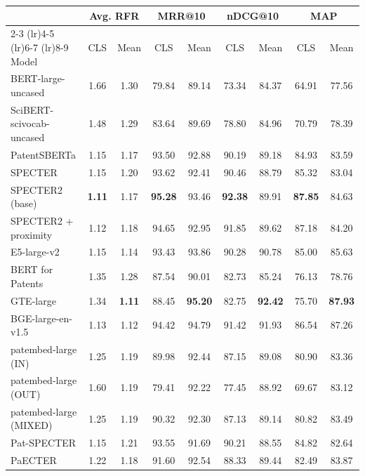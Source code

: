 \begin{tabular}{l cc cc cc cc}
    \toprule
    & \multicolumn{2}{c}{Avg. RFR} & \multicolumn{2}{c}{MRR@10} & \multicolumn{2}{c}{nDCG@10} & \multicolumn{2}{c}{MAP} \\
    \cmidrule(lr){2-3} \cmidrule(lr){4-5} \cmidrule(lr){6-7} \cmidrule(lr){8-9}
Model & CLS & Mean & CLS & Mean & CLS & Mean & CLS & Mean \\
    \midrule
    BERT-large-uncased & 1.66 & 1.30 & 79.84 & 89.14 & 73.34 & 84.37 & 64.91 & 77.56 \\
    SciBERT-scivocab-uncased & 1.48 & 1.29 & 83.64 & 89.69 & 78.80 & 84.96 & 70.79 & 78.39 \\
    PatentSBERTa & 1.15 & 1.17 & 93.50 & 92.88 & 90.19 & 89.18 & 84.93 & 83.59 \\
    SPECTER & 1.15 & 1.20 & 93.62 & 92.41 & 90.46 & 88.79 & 85.32 & 83.04 \\
    SPECTER2 (base) & \textbf{1.11} & 1.17 & \textbf{95.28} & 93.46 & \textbf{92.38} & 89.91 & \textbf{87.85} & 84.63 \\
    SPECTER2 + proximity & 1.12 & 1.18 & 94.65 & 92.95 & 91.85 & 89.62 & 87.18 & 84.20 \\
    E5-large-v2 & 1.15 & 1.14 & 93.43 & 93.86 & 90.28 & 90.78 & 85.00 & 85.63 \\
    BERT for Patents & 1.35 & 1.28 & 87.54 & 90.01 & 82.73 & 85.24 & 76.13 & 78.76 \\
    GTE-large & 1.34 & \textbf{1.11} & 88.45 & \textbf{95.20} & 82.75 & \textbf{92.42} & 75.70 & \textbf{87.93} \\
    BGE-large-en-v1.5 & 1.13 & 1.12 & 94.42 & 94.79 & 91.42 & 91.93 & 86.54 & 87.26 \\
    patembed-large (IN) & 1.25 & 1.19 & 89.98 & 92.44 & 87.15 & 89.08 & 80.90 & 83.36 \\
    patembed-large (OUT) & 1.60 & 1.19 & 79.41 & 92.22 & 77.45 & 88.92 & 69.67 & 83.12 \\
    patembed-large (MIXED) & 1.25 & 1.19 & 90.32 & 92.30 & 87.13 & 89.14 & 80.82 & 83.49 \\
    Pat-SPECTER & 1.15 & 1.21 & 93.55 & 91.69 & 90.21 & 88.55 & 84.82 & 82.64 \\
    PaECTER & 1.22 & 1.18 & 91.60 & 92.54 & 88.33 & 89.44 & 82.49 & 83.87 \\
    \bottomrule
\end{tabular}
